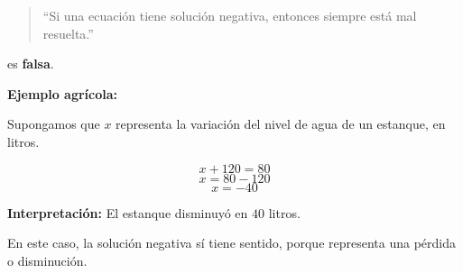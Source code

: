 \documentclass[11pt]{article}
\begin{document}
\begin{enumerate}[label=\textbf{\arabic*.}]
	\begin{quote}
		``Si una ecuación tiene solución negativa, entonces siempre está mal resuelta.''
	\end{quote}
	
	es \textbf{falsa}.
	
	\textbf{Ejemplo agrícola:}
	
	Supongamos que \(x\) representa la variación del nivel de agua de un estanque, en litros.
	
	\[
	x+120=80
	\]
	\[
	x=80-120
	\]
	\[
	x=-40
	\]
	
	\textbf{Interpretación:} El estanque disminuyó en \(40\) litros.
	
	En este caso, la solución negativa sí tiene sentido, porque representa una pérdida o disminución.
	
\end{enumerate}
\end{document}
